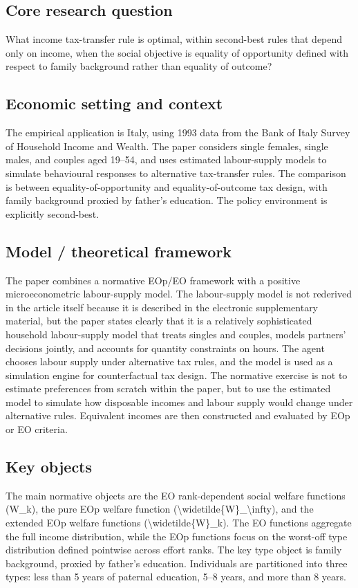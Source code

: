 \documentclass[11pt,a4paper]{article}
\begin{document}
\subsection*{Core research question}
What income tax-transfer rule is optimal, within second-best rules that depend only on income, when the social objective is equality of opportunity defined with respect to family background rather than equality of outcome?

\subsection*{Economic setting and context}
The empirical application is Italy, using 1993 data from the Bank of Italy Survey of Household Income and Wealth. The paper considers single females, single males, and couples aged 19–54, and uses estimated labour-supply models to simulate behavioural responses to alternative tax-transfer rules. The comparison is between equality-of-opportunity and equality-of-outcome tax design, with family background proxied by father’s education. The policy environment is explicitly second-best.

\subsection*{Model / theoretical framework}
The paper combines a normative EOp/EO framework with a positive microeconometric labour-supply model. The labour-supply model is not rederived in the article itself because it is described in the electronic supplementary material, but the paper states clearly that it is a relatively sophisticated household labour-supply model that treats singles and couples, models partners’ decisions jointly, and accounts for quantity constraints on hours. The agent chooses labour supply under alternative tax rules, and the model is used as a simulation engine for counterfactual tax design. The normative exercise is not to estimate preferences from scratch within the paper, but to use the estimated model to simulate how disposable incomes and labour supply would change under alternative rules. Equivalent incomes are then constructed and evaluated by EOp or EO criteria.

\subsection*{Key objects}
The main normative objects are the EO rank-dependent social welfare functions (W\_k), the pure EOp welfare function (\textbackslash{}widetilde\{W\}\_\textbackslash{}infty), and the extended EOp welfare functions (\textbackslash{}widetilde\{W\}\_k). The EO functions aggregate the full income distribution, while the EOp functions focus on the worst-off type distribution defined pointwise across effort ranks. The key type object is family background, proxied by father’s education. Individuals are partitioned into three types: less than 5 years of paternal education, 5–8 years, and more than 8 years.
\end{document}
